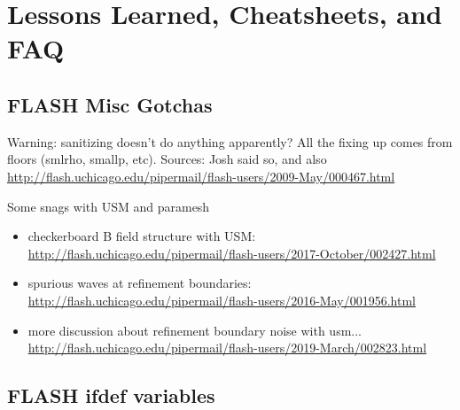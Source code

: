 \documentclass[10pt]{article}
\begin{document}
\section{Lessons Learned, Cheatsheets, and FAQ}

\subsection{FLASH Misc Gotchas}

Warning: sanitizing doesn't do anything apparently?
All the fixing up comes from floors (smlrho, smallp, etc).
Sources: Josh said so, and also
\url{http://flash.uchicago.edu/pipermail/flash-users/2009-May/000467.html}

Some snags with USM and paramesh
\begin{itemize}
    \item checkerboard B field structure with USM:
        \url{http://flash.uchicago.edu/pipermail/flash-users/2017-October/002427.html}

    \item spurious waves at refinement boundaries:
        \url{http://flash.uchicago.edu/pipermail/flash-users/2016-May/001956.html}

    \item more discussion about refinement boundary noise with usm...
        \url{http://flash.uchicago.edu/pipermail/flash-users/2019-March/002823.html}
\end{itemize}





\subsection{FLASH ifdef variables}
\end{document}
